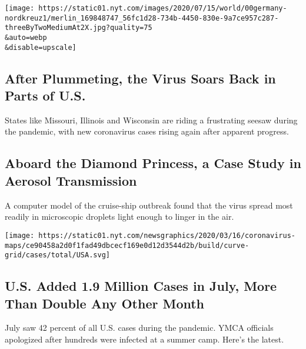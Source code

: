 \href{/2020/08/01/world/europe/germany-nazi-infiltration.html}{}

\texttt{[image: https://static01.nyt.com/images/2020/07/15/world/00germany-nordkreuz1/merlin\_169848747\_56fc1d28-734b-4450-830e-9a7ce957c287-threeByTwoMediumAt2X.jpg?quality=75\\\&auto=webp\\\&disable=upscale]}

\href{/2020/08/01/us/coronavirus-midwest-cases-deaths.html}{}

\hypertarget{after-plummeting-the-virus-soars-back-in-parts-of-us}{%
\subsection{After Plummeting, the Virus Soars Back in Parts of
U.S.}\label{after-plummeting-the-virus-soars-back-in-parts-of-us}}

States like Missouri, Illinois and Wisconsin are riding a frustrating
seesaw during the pandemic, with new coronavirus cases rising again
after apparent progress.

\href{/2020/07/30/health/diamond-princess-coronavirus-aerosol.html}{}

\hypertarget{aboard-the-diamond-princess-a-case-study-in-aerosol-transmission}{%
\subsection{Aboard the Diamond Princess, a Case Study in Aerosol
Transmission}\label{aboard-the-diamond-princess-a-case-study-in-aerosol-transmission}}

A computer model of the cruise-ship outbreak found that the virus spread
most readily in microscopic droplets light enough to linger in the air.

\texttt{[image: https://static01.nyt.com/newsgraphics/2020/03/16/coronavirus-maps/ce90458a2d0f1fad49dbcecf169e0d12d3544d2b/build/curve-grid/cases/total/USA.svg]}

\href{/2020/08/01/world/coronavirus-covid-19.html}{}

\hypertarget{us-added-19-million-cases-in-july-more-than-double-any-other-month}{%
\subsection{U.S. Added 1.9 Million Cases in July, More Than Double Any
Other
Month}\label{us-added-19-million-cases-in-july-more-than-double-any-other-month}}

July saw 42 percent of all U.S. cases during the pandemic. YMCA
officials apologized after hundreds were infected at a summer camp.
Here's the latest.

